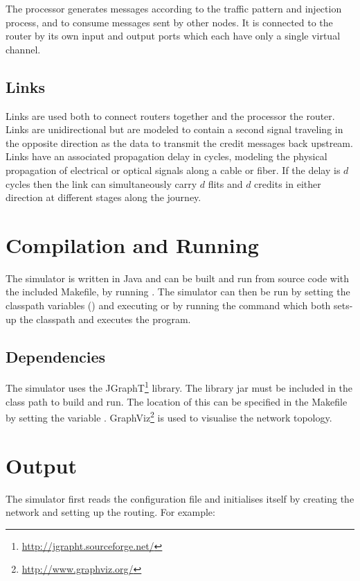 \documentclass[10pt,a4paper]{article}
\begin{document}
The processor generates messages according to the traffic pattern and injection
process, and to consume messages sent by other nodes. It is connected to the
router by its own input and output ports which each have only a single virtual
channel. 

\subsection{Links}

Links are used both to connect routers together and the processor the
router. Links are unidirectional but are modeled to contain a second signal
traveling in the opposite direction as the data to transmit the credit messages
back upstream. Links have an associated propagation delay in cycles, modeling
the physical propagation of electrical or optical signals along a cable or
fiber. If the delay is $d$ cycles then the link can simultaneously carry $d$
flits and $d$ credits in either direction at different stages along the journey.

\section{Compilation and Running}

The simulator is written in Java and can be built and run from source code with
the included Makefile, by running . The simulator can then be run by
setting the classpath variables () and executing
 or by running the
command  which both sets-up the classpath and executes the
program.

\subsection{Dependencies}

The simulator uses the JGraphT\footnote{\url{http://jgrapht.sourceforge.net/}}
library. The library jar must be included in the class path to build and run. The
location of this can be specified in the Makefile by setting the variable
. GraphViz\footnote{\url{http://www.graphviz.org/}} is
used to visualise the network topology.

\section{Output}

The simulator first reads the configuration file and initialises itself by
creating the network and setting up the routing. For example: 
\end{document}
